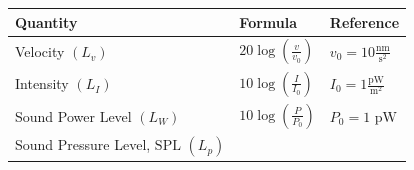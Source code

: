 \documentclass[
]{book}
\begin{document}
\begin{longtable}[]{@{}lll@{}}
\toprule
\begin{minipage}[b]{0.39\columnwidth}\raggedright
Quantity\strut
\end{minipage} & \begin{minipage}[b]{0.26\columnwidth}\raggedright
Formula\strut
\end{minipage} & \begin{minipage}[b]{0.26\columnwidth}\raggedright
Reference\strut
\end{minipage}\tabularnewline
\midrule
\endhead
\begin{minipage}[t]{0.39\columnwidth}\raggedright
Velocity \(\left( L_v \right)\)\strut
\end{minipage} & \begin{minipage}[t]{0.26\columnwidth}\raggedright
\(20 \log \left( \frac{v}{v_0} \right)\)\strut
\end{minipage} & \begin{minipage}[t]{0.26\columnwidth}\raggedright
\(v_0 = 10 \frac{\text{nm}}{\text{s}^2}\)\strut
\end{minipage}\tabularnewline
\begin{minipage}[t]{0.39\columnwidth}\raggedright
Intensity \(\left( L_I \right)\)\strut
\end{minipage} & \begin{minipage}[t]{0.26\columnwidth}\raggedright
\(10 \log \left( \frac{I}{I_0} \right)\)\strut
\end{minipage} & \begin{minipage}[t]{0.26\columnwidth}\raggedright
\(I_0 = 1 \frac{\text{pW}}{\text{m}^2}\)\strut
\end{minipage}\tabularnewline
\begin{minipage}[t]{0.39\columnwidth}\raggedright
Sound Power Level \(\left( L_W \right)\)\strut
\end{minipage} & \begin{minipage}[t]{0.26\columnwidth}\raggedright
\(10 \log \left( \frac{P}{P_0} \right)\)\strut
\end{minipage} & \begin{minipage}[t]{0.26\columnwidth}\raggedright
\(P_0 = 1 \text{ pW}\)\strut
\end{minipage}\tabularnewline
\begin{minipage}[t]{0.39\columnwidth}\raggedright
Sound Pressure Level, \(\mathrm{SPL}\) \(\left( L_p \right)\)\strut
\end{minipage} & \begin{minipage}[t]{0.26\columnwidth}\raggedright

\end{minipage}
\end{longtable}
\end{document}

